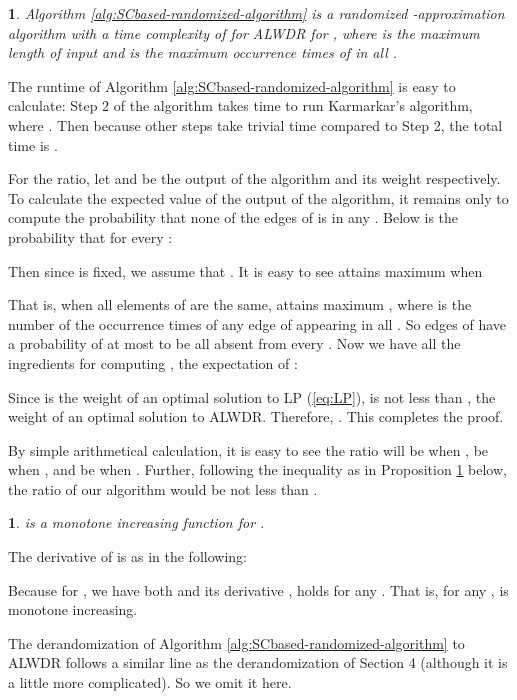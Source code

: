 \documentclass[11pt,english,onecolumn,draftcls]{IEEEtran}
\theoremstyle{plain}
\theoremstyle{plain}
\newtheorem{prop}[thm]{\protect\propositionname}
\theoremstyle{plain}
\newtheorem{lem}[thm]{\protect\lemmaname}
\theoremstyle{plain}
\providecommand{\lemmaname}{Lemma}
\providecommand{\propositionname}{Proposition}
\begin{document}
\begin{lem}
\label{lem:SCratioproof}Algorithm \ref{alg:SCbased-randomized-algorithm}
is a randomized -approximation algorithm
with a time complexity of 
for ALWDR for , where  is the maximum
length of input and  is the maximum occurrence times of  in
all . \end{lem}
\begin{IEEEproof}
The runtime of Algorithm \ref{alg:SCbased-randomized-algorithm}
is easy to calculate: Step 2 of the algorithm takes 
time to run Karmarkar's algorithm, where .
Then because other steps take trivial time compared to Step 2, the
total time is .

For the ratio, let  and  be the output of the algorithm
and its weight respectively. To calculate the expected value of the
output of the algorithm, it remains only to compute the probability
that none of the edges of  is in any .
Below is the probability that  for
every :




Then since 
is fixed, we assume that .
It is easy to see  attains maximum when




That is, when all elements of 
are the same, 
attains maximum , where  is the number of
the occurrence times of any edge of  appearing in all
. So edges of  have a probability of at most
 to be all absent from every . Now
we have all the ingredients for computing , the expectation
of :

Since  is the weight of an optimal solution to LP (\ref{eq:LP}),
 is not less than , the weight of an optimal solution
to ALWDR. Therefore, .
This completes the proof.
\end{IEEEproof}
By simple arithmetical calculation, it is easy to see the ratio will
be  when , be  when , and be  when
. Further, following the inequality as in Proposition \ref{prop:calK}
below, the ratio of our algorithm would be not less than .
\begin{prop}
\label{prop:calK} is a monotone increasing
function for .\end{prop}
\begin{IEEEproof}
The derivative of  is as in the following:


Because for , we have both 
and its derivative ,
 holds for any . That is, for any , 
is monotone increasing.
\end{IEEEproof}
The derandomization of Algorithm \ref{alg:SCbased-randomized-algorithm}
to ALWDR follows a similar line as the derandomization
of Section 4 (although it is a little more complicated). So we omit
it here.
\end{document}
